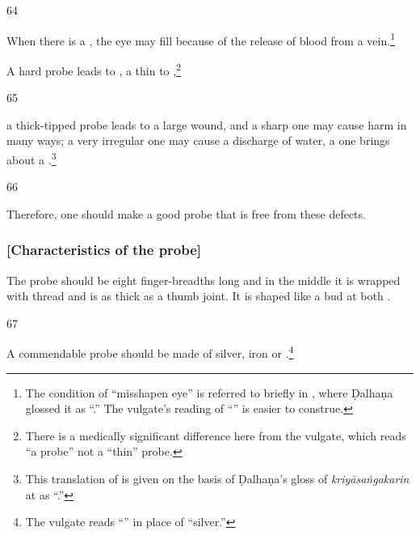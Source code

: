 \begin{translation}
    
    \item[64] 
    
    When there is a , the eye may fill because of the
    release of blood from a vein.\footnote{The condition of “misshapen eye” is referred
    to briefly in , where Ḍalhaṇa glossed it as
    “.”  The vulgate's reading of “” is easier to construe.}
    
    
    A hard probe leads to , a thin to
    ,\footnote{There is a medically
    significant difference here from the vulgate, which reads “a 
    probe” not a “thin” probe.}
    
    \item[65]
    
    a thick-tipped probe leads to a large wound, and a sharp one may cause harm in many 
    ways;
    a very irregular one may cause a discharge of water, a  one brings about 
    a .\footnote{This translation of  is given on the basis of Ḍalhaṇa's gloss of \emph{kriyāsaṅgakarin} at 
    as “.”}
    
    \item[66]
    
    Therefore, one should make a good probe that is free from these defects.
    
\end{translation}

\subsubsection{[Characteristics of the probe]}

\begin{translation}
    
    \item[\empty ] 
    The probe should be eight finger-breadths long and in the middle it is wrapped with thread 
    and is as thick as a thumb joint.  It is shaped like a bud at both .
    
    \item[67]
    
    A commendable probe should be made of silver, iron or 
    .\footnote{The vulgate reads “” in place of 
    “silver.”}
    
    
\end{translation}

